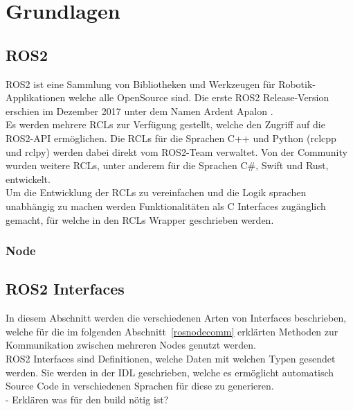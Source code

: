\section {Grundlagen}
\subsection{ROS2}
\ac{ROS2} ist eine Sammlung von Bibliotheken und Werkzeugen für Robotik-Applikationen welche alle OpenSource sind.
Die erste \ac{ROS2} Release-Version erschien im Dezember 2017 unter dem Namen Ardent Apalon \citet{ros2docs}.\\
Es werden  mehrere \acp{RCL}  zur Verfügung gestellt, welche den Zugriff auf die \ac{ROS2}-API ermöglichen.
Die \acp{RCL} für die Sprachen C++ und Python (rclcpp und rclpy) werden dabei direkt vom \ac{ROS2}-Team verwaltet.
Von der Community wurden weitere \acp{RCL}, unter anderem für die Sprachen C\#, Swift und Rust, entwickelt.\\
Um die Entwicklung der \acp{RCL} zu vereinfachen und die Logik sprachen unabhängig zu machen werden Funktionalitäten als C Interfaces zugänglich gemacht, für welche in den \acp{RCL} Wrapper geschrieben werden.
\subsubsection{Node}
\subsection{ROS2 Interfaces}
In diesem Abschnitt werden die verschiedenen Arten von Interfaces beschrieben, welche für die im folgenden Abschnitt~\ref{rosnodecomm} erklärten Methoden zur Kommunikation zwischen mehreren Nodes genutzt werden.\\
\ac{ROS2} Interfaces sind Definitionen, welche Daten mit welchen Typen gesendet werden.
Sie werden in der \ac{IDL} geschrieben, welche es ermöglicht automatisch Source Code in verschiedenen Sprachen für diese zu generieren.\\
- Erklären was für den build nötig ist?
